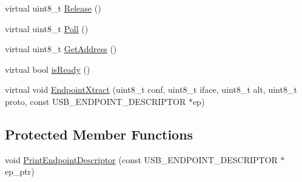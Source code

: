 \begin{DoxyCompactItemize}
\item 
virtual uint8\-\_\-t \hyperlink{class_a_c_m_a768c0fd4ef7f5c52de9e5e7431685279}{\-Release} ()
\item 
virtual uint8\-\_\-t \hyperlink{class_a_c_m_a79e4da2cae9145d895a6a1211a96fe36}{\-Poll} ()
\item 
virtual uint8\-\_\-t \hyperlink{class_a_c_m_a7e0bb108012af9a99bb98aefca036d84}{\-Get\-Address} ()
\item 
virtual bool \hyperlink{class_a_c_m_a7161082e88359738596dd12a706ee286}{is\-Ready} ()
\item 
virtual void \hyperlink{class_a_c_m_af5b411a7ccc82bd77a7c5cfba6cd9a86}{\-Endpoint\-Xtract} (uint8\-\_\-t conf, uint8\-\_\-t iface, uint8\-\_\-t alt, uint8\-\_\-t proto, const \-U\-S\-B\-\_\-\-E\-N\-D\-P\-O\-I\-N\-T\-\_\-\-D\-E\-S\-C\-R\-I\-P\-T\-O\-R $\ast$ep)
\end{DoxyCompactItemize}
\subsection*{\-Protected \-Member \-Functions}
\begin{DoxyCompactItemize}
\item 
void \hyperlink{class_a_c_m_aa05a65487f5e02bab40ccba1018ee5b6}{\-Print\-Endpoint\-Descriptor} (const \-U\-S\-B\-\_\-\-E\-N\-D\-P\-O\-I\-N\-T\-\_\-\-D\-E\-S\-C\-R\-I\-P\-T\-O\-R $\ast$ep\-\_\-ptr)
\end{DoxyCompactItemize}
